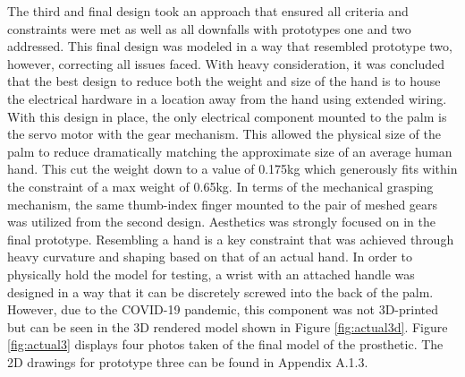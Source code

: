 \documentclass[11.5pt]{article}
\begin{document}
The third and final design took an approach that ensured all criteria and constraints were met as well as all downfalls with prototypes one and two addressed. This final design was modeled in a way that resembled prototype two, however, correcting all issues faced. With heavy consideration, it was concluded that the best design to reduce both the weight and size of the hand is to house the electrical hardware in a location away from the hand using extended wiring. With this design in place, the only electrical component mounted to the palm is the servo motor with the gear mechanism. This allowed the physical size of the palm to reduce dramatically matching the approximate size of an average human hand. This cut the weight down to a value of 0.175kg which generously fits within the constraint of a max weight of 0.65kg. In terms of the mechanical grasping mechanism, the same thumb-index finger mounted to the pair of meshed gears was utilized from the second design. Aesthetics was strongly focused on in the final prototype. Resembling a hand is a key constraint that was achieved through heavy curvature and shaping based on that of an actual hand. In order to physically hold the model for testing, a wrist with an attached handle was designed in a way that it can be discretely screwed into the back of the palm. However, due to the COVID-19 pandemic, this component was not 3D-printed but can be seen in the 3D rendered model shown in Figure \ref{fig:actual3d}. Figure \ref{fig:actual3} displays four photos taken of the final model of the prosthetic. The 2D drawings for prototype three can be found in Appendix A.1.3. \\
\end{document}
